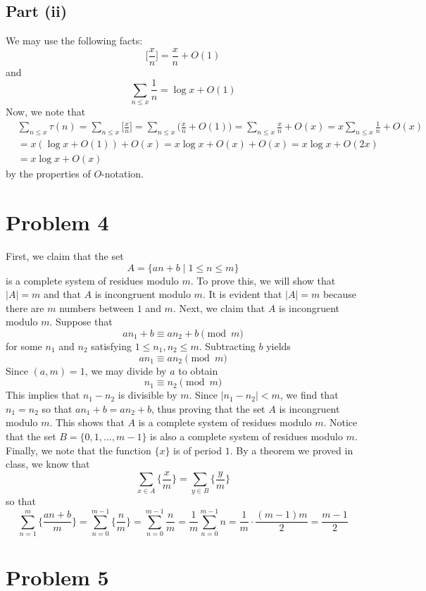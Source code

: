\documentclass[12pt]{article}
\begin{document}
\subsection*{Part (ii)}
We may use the following facts: 
\[
\bigg [ \frac{x}{n} \bigg ] = \frac{x}{n} + O(1)
\] and
\[
\sum_{n \leq x} \frac{1}{n} = \log x + O(1)
\] Now, we note that
\begin{align*}
&\sum_{n \leq x} \tau(n) = \sum_{n \leq x} \bigg[ \frac{x}{n} \bigg] = \sum_{n \leq x} \bigg( \frac{x}{n} + O(1) \bigg) = \sum_{n \leq x} \frac{x}{n} + O(x) = x \sum_{n \leq x} \frac{1}{n} + O(x) \\
&= x(\log x + O(1)) + O(x) = x\log x + O(x) + O(x) = x\log x + O(2x)\\
& = x\log x + O(x)
\end{align*} by the properties of \(O\)-notation.
\newpage
\section*{Problem 4}
First, we claim that the set
\[
A = \{an+b \mid 1 \leq n \leq m\}
\] is a complete system of residues modulo \(m\). To prove this, we will show that \(\vert A \vert = m\) and that \(A\) is incongruent modulo \(m\). It is evident that \(\vert A \vert = m\) because there are \(m\) numbers between \(1\) and \(m\). Next, we claim that \(A\) is incongruent modulo \(m\). Suppose that 
\[
an_1 + b \equiv an_2 + b \pmod{m}
\]
 for some $n_1$ and $n_2$ satisfying \(1 \leq n_1, n_2 \leq m\). Subtracting \(b\) yields
 \[
an_1 \equiv an_2 \pmod{m} 
 \] Since \((a,m) = 1\), we may divide by \(a\) to obtain
 \[
 n_1 \equiv n_2 \pmod{m}
 \] This implies that \(n_1 - n_2\) is divisible by \(m\). Since \(\vert n_1 - n_2 \vert < m\), we find that \(n_1 = n_2\) so that \(an_1 + b = an_2 + b\), thus proving that the set \(A\) is incongruent modulo $m$. This shows that \(A\) is a complete system of residues modulo \(m\). Notice that the set \(B = \{0,1,\ldots,m-1\}\) is also a complete system of residues modulo \(m\). Finally, we note that the function \(\{x\}\) is of period \(1\). By a theorem we proved in class, we know that
\[
\sum_{x \in A} \bigg\{ \frac{x}{m}\bigg\} = \sum_{y \in B} \bigg\{ \frac{y}{m}\bigg\}
\]
so that 
 \[
 \sum_{n=1}^{m} \bigg\{ \frac{an+b}{m} \bigg\} = \sum_{n=0}^{m-1} \bigg\{\frac{n}{m}\bigg\} = \sum_{n=0}^{m-1} \frac{n}{m} = \frac{1}{m} \sum_{n=0}^{m-1} n = \frac{1}{m} \cdot \frac{(m-1)m}{2} = \frac{m-1}{2}
 \]
\newpage
\section*{Problem 5}
\end{document}
